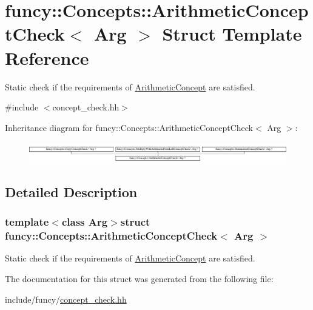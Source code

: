 \hypertarget{structfuncy_1_1Concepts_1_1ArithmeticConceptCheck}{\section{funcy\-:\-:Concepts\-:\-:Arithmetic\-Concept\-Check$<$ Arg $>$ Struct Template Reference}
\label{structfuncy_1_1Concepts_1_1ArithmeticConceptCheck}
}


Static check if the requirements of \hyperlink{structfuncy_1_1Concepts_1_1ArithmeticConcept}{Arithmetic\-Concept} are satisfied.  




{\ttfamily \#include $<$concept\-\_\-check.\-hh$>$}

Inheritance diagram for funcy\-:\-:Concepts\-:\-:Arithmetic\-Concept\-Check$<$ Arg $>$\-:\begin{figure}[H]
\begin{center}
\leavevmode
\includegraphics[height=0.891010cm]{structfuncy_1_1Concepts_1_1ArithmeticConceptCheck}
\end{center}
\end{figure}


\subsection{Detailed Description}
\subsubsection*{template$<$class Arg$>$struct funcy\-::\-Concepts\-::\-Arithmetic\-Concept\-Check$<$ Arg $>$}

Static check if the requirements of \hyperlink{structfuncy_1_1Concepts_1_1ArithmeticConcept}{Arithmetic\-Concept} are satisfied. 

The documentation for this struct was generated from the following file\-:\begin{DoxyCompactItemize}
\item 
include/funcy/\hyperlink{concept__check_8hh}{concept\-\_\-check.\-hh}\end{DoxyCompactItemize}
